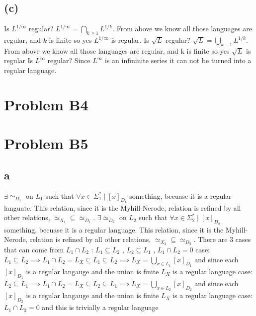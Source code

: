 \documentclass[12pt]{article}
\begin{document}
\subsection*{(c)}
Is $L^{1/\infty}$ regular? $L^{1/\infty} = \bigcap_{k\ge1}L^{1/k}$.
From above we know all those languages are regular, and $k$ is finite so
yes $L^{1/\infty}$ is regular.
\newline
Is $\sqrt{L}$ regular? $\sqrt{L} = \bigcup_{k-1}L^{1/k}$.
From above we know all those languages are regular,
and k is finite so yes $\sqrt{L}$ is regular
\newline
Is $L^{\infty}$ regular? Since $L^{\infty}$ is an infininite series it can not be turned into a regular language.
\section*{Problem B4}

\section*{Problem B5}
\subsection*{a}
$\exists \simeq_{D_1}$ on $L_1$ such that $\forall x \in \Sigma^{*}_1 \mid [x]_{D_1}$ something, becuase it is a regular languate. This relation, since it is the Myhill-Nerode, relation is refined by all other relations, $\simeq_{X_1} \subseteq \simeq_{D_1}$.  $\exists \simeq_{D_2}$ on $L_2$ such that $\forall x \in \Sigma^{*}_2 \mid [x]_{D_2}$ something, becuase it is a regular language. This relation, since it is the Myhill-Nerode, relation is refined by all other relations, $\simeq_{X_2} \subseteq \simeq_{D_2}$.
There are 3 cases that can come from $L_1 \cap L_2$ : $L_1 \subseteq L_2$ , $L_2 \subseteq L_1$ , $L_1 \cap L_2 = {0}$\newline
case: $L_1 \subseteq L_2 \implies L_1 \cap L_2 = L_X \subseteq L_1 \subseteq L_2 \implies L_X = \bigcup_{x \in L_1}[x]_{D_1}$ and since each $[x]_{D_1}$ is a regular langauge and the union is finite $L_X$ is a regular language\newline
case: $L_2 \subseteq L_1\implies L_1 \cap L_2 = L_X \subseteq L_2 \subseteq L_1 \implies L_X = \bigcup_{x \in L_2}[x]_{D_2}$ and since each $[x]_{D_2}$ is a regular langauge and the union is finite $L_X$ is a regular language\newline
case: $L_1 \cap L_2 = {0}$ and this is trivially a regular language
\end{document}
